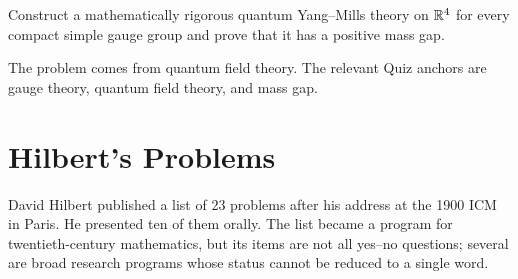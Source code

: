     \begin{openproblem}
        Construct a mathematically rigorous quantum Yang--Mills theory on
        $\mathbb{R}^4$ for every compact simple gauge group and prove that it has a
        positive mass gap.
    \end{openproblem}

    \begin{remark}
        The problem comes from quantum field theory. The relevant Quiz anchors
        are gauge theory, quantum field theory, and mass gap.
    \end{remark}

    \section*{Hilbert's Problems}

    David Hilbert published a list of $23$ problems after his address at the
    1900 ICM in Paris. He presented ten of them orally. The list became a
    program for twentieth-century mathematics, but its items are not all
    yes--no questions; several are broad research programs whose status cannot
    be reduced to a single word.

    \vspace{1em}

